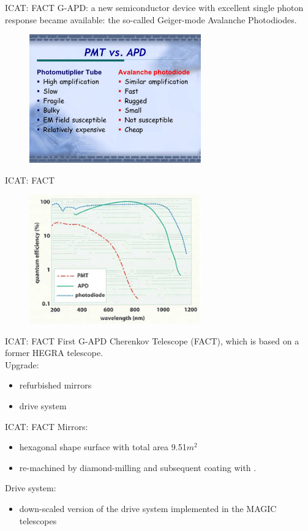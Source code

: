 \documentclass{beamer}
\begin{document}
\begin{frame}{ICAT: FACT}
	G-APD: a new semiconductor device with excellent single photon response became available: the so-called Geiger-mode Avalanche Photodiodes.
	\begin{figure}[h]
		\includegraphics[width=280px]{PMTvsAPD.jpg}
	\end{figure}
\end{frame}


\begin{frame}{ICAT: FACT}
	\begin{figure}[h]
		\includegraphics[width=280px]{DetectorsGuidepost.jpg}
	\end{figure}
\end{frame}

\begin{frame}{ICAT: FACT}
	First G-APD Cherenkov Telescope (FACT), which is based on a former HEGRA telescope.
	\newline
	\\
	Upgrade:
	\begin{itemize}
		\item refurbished mirrors
		\item drive system
	\end{itemize}
\end{frame}


\begin{frame}{ICAT: FACT}
	Mirrors:
	\begin{itemize}
		\item hexagonal shape surface with total area 9.51$m^2$
		\item re-machined by diamond-milling and subsequent coating with .
	\end{itemize}
	\hfill \break
	Drive system:
	\begin{itemize}
		\item down-scaled version of the drive system implemented in the MAGIC telescopes
	\end{itemize}
\end{frame}
\end{document}
